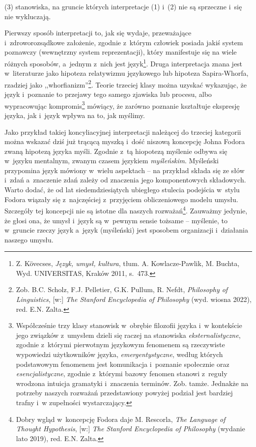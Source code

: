 (3) stanowiska, na gruncie których interpretacje (1) i~(2) nie są sprzeczne i~się nie wykluczają.

Pierwszy sposób interpretacji to, jak się wydaje, przeważające i~zdroworozsądkowe założenie, zgodnie z~którym człowiek posiada jakiś system poznawczy (wewnętrzny system reprezentacji), który manifestuje się na wiele różnych sposobów, a~jednym z~nich jest język\footnote{Z. Kövecses, \textit{Język, umysł, kultura}, tłum. A. Kowlacze-Pawlik, M. Buchta, Wyd. UNIVERSITAS, Kraków 2011, s.~473.}. Druga interpretacja znana jest w~literaturze jako hipoteza relatywizmu językowego lub hipoteza Sapira-Whorfa, rzadziej jako ,,whorfianizm''\footnote{Zob. B.C. Scholz, F.J. Pelletier, G.K. Pullum, R. Nefdt, \textit{Philosophy of Linguistics}, [w:] \textit{The Stanford Encyclopedia of Philosophy} (wyd. wiosna 2022), red. E.N. Zalta.}. Teorie trzeciej klasy można uzyskać wykazując, że język i~poznanie to przejawy tego samego zjawiska lub procesu, albo wypracowując kompromis\footnote{Współcześnie trzy klasy stanowisk w~obrębie filozofii języka i~w kontekście jego związków z~umysłem dzieli się raczej na stanowiska \textit{eksternalistyczne}, zgodnie z~którymi pierwotnym językowym fenomenem są rzeczywiste wypowiedzi użytkowników języka, \textit{emergentystyczne}, według których podstawowym fenomenem jest komunikacja i~poznanie społecznie oraz \textit{esencjalistyczne}, zgodnie z~którymi bazowy fenomen stanowi z~reguły wrodzona intuicja gramatyki i~znaczenia terminów. Zob. tamże. Jednakże na potrzeby naszych rozważań przedstawiony powyżej podział jest bardziej trafny i~w zupełności wystarczający.} mówiący, że zarówno poznanie kształtuje ekspresję języka, jak i~język wpływa na to, jak myślimy.

Jako przykład takiej koncyliacyjnej interpretacji należącej do trzeciej kategorii można wskazać dziś już trącącą myszką i~dość niszową koncepcję Johna Fodora zwaną hipotezą języka myśli. Zgodnie z~tą hiopotezą myślenie odbywa się w~języku mentalnym, zwanym czasem językiem \textit{myśleńskim}. Myśleński przypomina język mówiony w~wielu aspektach -- na przykład składa się ze słów i~zdań a~znaczenie zdań zależy od znaczenia jego komponentowych składowych. Warto dodać, że od lat siedemdziesiątych ubiegłego stulecia podejścia w~stylu Fodora wiązały się z~najczęściej z~przyjęciem obliczeniowego modelu umysłu. Szczegóły tej koncepcji nie są istotne dla naszych rozważań\footnote{Dobry wgląd w~koncepcję Fodora daje M. Rescorla, \textit{The Language of Thought Hypothesis}, [w:] \textit{The Stanford Encyclopedia of Philosophy} (wydanie lato 2019), red. E.N. Zalta.}. Zauważmy jedynie, że głosi ona, że umysł i~język są w~pewnym sensie tożsame -- myślenie, to w~gruncie rzeczy język a~język (myśleński) jest sposobem organizacji i~działania naszego umysłu.


